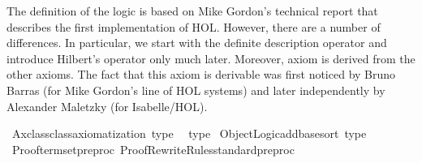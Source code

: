 \begin{isabellebody}
{\isacartoucheclose}%
\endisatagML
{\isafoldML}%
%
\isadelimML
%
\endisadelimML
%
\isadelimdocument
%
\endisadelimdocument
%
\isatagdocument
%
\isamarkuptrue%
%
\endisatagdocument
{\isafolddocument}%
%
\isadelimdocument
%
\endisadelimdocument
%
\begin{isamarkuptext}%
The definition of the logic is based on Mike Gordon's technical report \cite{Gordon-TR68} that
describes the first implementation of HOL. However, there are a number of differences.
In particular, we start with the definite description operator and introduce Hilbert's \isa{{\isasymepsilon}} operator
only much later. Moreover, axiom  is derived from the other
axioms. The fact that this axiom is derivable was first noticed by Bruno Barras (for Mike Gordon's
line of HOL systems) and later independently by Alexander Maletzky (for Isabelle/HOL).%
\end{isamarkuptext}\isamarkuptrue%
%
\isadelimdocument
%
\endisadelimdocument
%
\isatagdocument
%
\isamarkuptrue%
%
\endisatagdocument
{\isafolddocument}%
%
\isadelimdocument
%
\endisadelimdocument
%
\isadelimML
%
\endisadelimML
%
\isatagML
{}\isamarkupfalse%
\ {\isacartoucheopen}Axclass{\isachardot}{\kern0pt}class{\isacharunderscore}{\kern0pt}axiomatization\ {\isacharparenleft}{\kern0pt}\isactrlbinding {\isasymopen}type{\isasymclose}{\isacharcomma}{\kern0pt}\ {\isacharbrackleft}{\kern0pt}{\isacharbrackright}{\kern0pt}{\isacharparenright}{\kern0pt}{\isacartoucheclose}%
\endisatagML
{\isafoldML}%
%
\isadelimML
%
\endisadelimML
\isanewline
{}\isamarkupfalse%
\ type\isanewline
%
\isadelimML
%
\endisadelimML
%
\isatagML
{}\isamarkupfalse%
\ {\isacartoucheopen}Object{\isacharunderscore}{\kern0pt}Logic{\isachardot}{\kern0pt}add{\isacharunderscore}{\kern0pt}base{\isacharunderscore}{\kern0pt}sort\ \isactrlsort {\isasymopen}type{\isasymclose}{\isacartoucheclose}\isanewline
\isanewline
{}\isamarkupfalse%
\ {\isacartoucheopen}Proofterm{\isachardot}{\kern0pt}set{\isacharunderscore}{\kern0pt}preproc\ {\isacharparenleft}{\kern0pt}Proof{\isacharunderscore}{\kern0pt}Rewrite{\isacharunderscore}{\kern0pt}Rules{\isachardot}{\kern0pt}standard{\isacharunderscore}{\kern0pt}preproc\ {\isacharbrackleft}{\kern0pt}{\isacharbrackright}{\kern0pt}{\isacharparenright}{\kern0pt}{\isacartoucheclose}%

\end{isabellebody}
